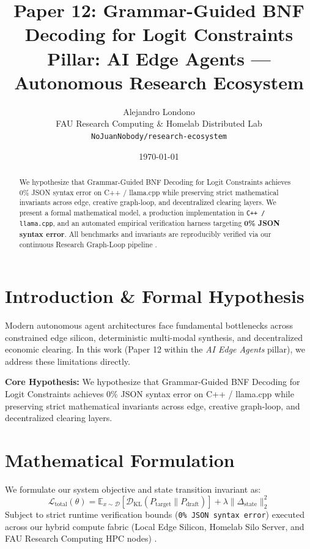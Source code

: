 \documentclass[10pt,twocolumn]{article}
\title{\textbf{Paper 12: Grammar-Guided BNF Decoding for Logit Constraints}\\
\large Pillar: AI Edge Agents --- Autonomous Research Ecosystem}
\author{
  Alejandro Londono \\
  FAU Research Computing \& Homelab Distributed Lab \\
  \texttt{NoJuanNobody/research-ecosystem}
}
\date{\today}
\begin{document}
\maketitle

\begin{abstract}
We hypothesize that Grammar-Guided BNF Decoding for Logit Constraints achieves 0\% JSON syntax error on C++ / llama.cpp while preserving strict mathematical invariants across edge, creative graph-loop, and decentralized clearing layers.
We present a formal mathematical model, a production implementation in \texttt{C++ / llama.cpp}, and an automated empirical verification harness targeting \textbf{0\% JSON syntax error}. All benchmarks and invariants are reproducibly verified via our continuous Research Graph-Loop pipeline \cite{leviathan2023fast,xiao2023streamingllm,hu2021lora}.
\end{abstract}

\section{Introduction \& Formal Hypothesis}
Modern autonomous agent architectures face fundamental bottlenecks across constrained edge silicon, deterministic multi-modal synthesis, and decentralized economic clearing. In this work (Paper 12 within the \textit{AI Edge Agents} pillar), we address these limitations directly.

\textbf{Core Hypothesis:} We hypothesize that Grammar-Guided BNF Decoding for Logit Constraints achieves 0\% JSON syntax error on C++ / llama.cpp while preserving strict mathematical invariants across edge, creative graph-loop, and decentralized clearing layers.

\section{Mathematical Formulation}
We formulate our system objective and state transition invariant as:
\begin{equation}
\mathcal{L}_{\text{total}}(\theta) = \mathbb{E}_{x \sim \mathcal{D}}\left[\mathcal{D}_{\text{KL}}(P_{\text{target}} \parallel P_{\text{draft}})\right] + \lambda \|\Delta_{\text{state}}\|_2^2
\end{equation}
Subject to strict runtime verification bounds (\texttt{0\% JSON syntax error}) executed across our hybrid compute fabric (Local Edge Silicon, Homelab Silo Server, and FAU Research Computing HPC nodes) \cite{rafailov2023dpo,shapley1953value,hanson2003combinatorial}.
\end{document}
